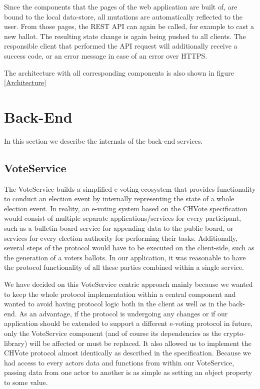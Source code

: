 Since the components that the pages of the web application are built of, are bound to the local data-store, all mutations are automatically reflected to the user. From those pages, the REST API can again be called, for example to cast a new ballot. The resulting state change is again being pushed to all clients. The responsible client that performed the API request will additionally receive a success code, or an error message in case of an error over HTTPS.

The architecture with all corresponding components is also shown in figure \ref{Architecture}
\section{Back-End}
In this section we describe the internals of the back-end services.
\subsection{VoteService}
The VoteService builds a simplified e-voting ecosystem that provides functionality to conduct an election event by internally representing the state of a whole election event. In reality, an e-voting system based on the CHVote specification would consist of multiple separate applications/services for every participant, such as a bulletin-board service for appending data to the public board, or services for every election authority for performing their tasks. Additionally, several steps of the protocol would have to be executed on the client-side, such as the generation of a voters ballots. In our application, it was reasonable to have the protocol functionality of all these parties combined within a single service.

We have decided on this VoteService centric approach mainly because we wanted to keep the whole protocol implementation within a central component and wanted to avoid having protocol logic both in the client as well as in the back-end. As an advantage, if the protocol is undergoing any changes or if our application should be extended to support a different e-voting protocol in future, only the VoteService component (and of course its dependencies as the crypto-library) will be affected or must be replaced. It also allowed us to implement the CHVote protocol almost identically as described in the specification. Because we had access to every actors data and functions from within our VoteService, passing data from one actor to another is as simple as setting an object property to some value.

